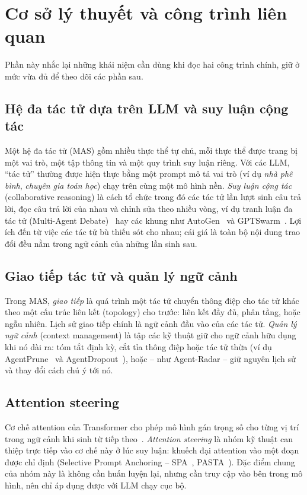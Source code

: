 \section{Cơ sở lý thuyết và công trình liên quan}\label{sec:background}

Phần này nhắc lại những khái niệm cần dùng khi đọc hai công trình chính, giữ ở mức vừa đủ để theo dõi các phần sau.

\subsection{Hệ đa tác tử dựa trên LLM và suy luận cộng tác}
Một hệ đa tác tử (MAS) gồm nhiều thực thể tự chủ, mỗi thực thể được trang bị một vai trò, một tập thông tin và một quy trình suy luận riêng. Với các LLM, ``tác tử'' thường được hiện thực bằng một prompt mô tả vai trò (ví dụ \emph{nhà phê bình}, \emph{chuyên gia toán học}) chạy trên cùng một mô hình nền. \emph{Suy luận cộng tác} (collaborative reasoning) là cách tổ chức trong đó các tác tử lần lượt sinh câu trả lời, đọc câu trả lời của nhau và chỉnh sửa theo nhiều vòng, ví dụ tranh luận đa tác tử (Multi-Agent Debate)~\cite{du2024debate} hay các khung như AutoGen~\cite{wu2024autogen} và GPTSwarm~\cite{zhuge2024gptswarm}. Lợi ích đến từ việc các tác tử bù thiếu sót cho nhau; cái giá là toàn bộ nội dung trao đổi đều nằm trong ngữ cảnh của những lần sinh sau.

\subsection{Giao tiếp tác tử và quản lý ngữ cảnh}
Trong MAS, \emph{giao tiếp} là quá trình một tác tử chuyển thông điệp cho tác tử khác theo một cấu trúc liên kết (topology) cho trước: liên kết đầy đủ, phân tầng, hoặc ngẫu nhiên. Lịch sử giao tiếp chính là ngữ cảnh đầu vào của các tác tử. \emph{Quản lý ngữ cảnh} (context management) là tập các kỹ thuật giữ cho ngữ cảnh hữu dụng khi nó dài ra: tóm tắt định kỳ, cắt tỉa thông điệp hoặc tác tử thừa (ví dụ AgentPrune~\cite{zhang2025agentprune} và AgentDropout~\cite{wang2025agentdropout}), hoặc -- như Agent-Radar -- giữ nguyên lịch sử và thay đổi cách chú ý tới nó.

\subsection{Attention steering}
Cơ chế attention của Transformer cho phép mô hình gán trọng số cho từng vị trí trong ngữ cảnh khi sinh từ tiếp theo~\cite{vaswani2017attention}. \emph{Attention steering} là nhóm kỹ thuật can thiệp trực tiếp vào cơ chế này ở lúc suy luận: khuếch đại attention vào một đoạn được chỉ định (Selective Prompt Anchoring -- SPA~\cite{tian2025spa}, PASTA~\cite{zhang2024pasta}). Đặc điểm chung của nhóm này là không cần huấn luyện lại, nhưng cần truy cập vào bên trong mô hình, nên chỉ áp dụng được với LLM chạy cục bộ.

